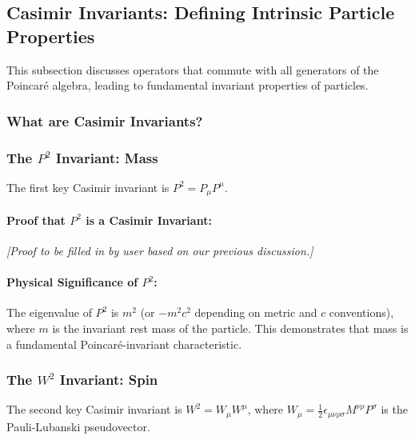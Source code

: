 \documentclass{amsart}
\theoremstyle{definition}
\theoremstyle{remark}
\begin{document}
\subsection{Casimir Invariants: Defining Intrinsic Particle Properties}
\label{subsec:casimir_invariants}
This subsection discusses operators that commute with all generators of the Poincaré algebra, leading to fundamental invariant properties of particles.

\subsubsection{What are Casimir Invariants?}
\label{subsubsec:what_are_casimirs}

\subsubsection{The $P^2$ Invariant: Mass}
\label{subsubsec:p_squared_invariant}
The first key Casimir invariant is $P^2 = P_\mu P^\mu$.

\paragraph{Proof that $P^2$ is a Casimir Invariant:}
\textit{[Proof to be filled in by user based on our previous discussion.]}

\paragraph{Physical Significance of $P^2$:}
The eigenvalue of $P^2$ is $m^2$ (or $-m^2 c^2$ depending on metric and $c$ conventions), where $m$ is the invariant rest mass of the particle. This demonstrates that mass is a fundamental Poincaré-invariant characteristic.

\subsubsection{The $W^2$ Invariant: Spin}
\label{subsubsec:w_squared_invariant}
The second key Casimir invariant is $W^2 = W_\mu W^\mu$, where $W_\mu = \frac{1}{2} \epsilon_{\mu\nu\rho\sigma} M^{\nu\rho} P^\sigma$ is the Pauli-Lubanski pseudovector.
\end{document}
